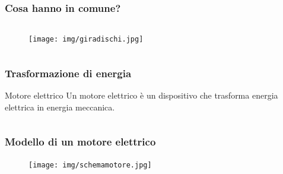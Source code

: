 \documentclass[]{beamer}
\theoremstyle{plain}
\begin{document}
\begin{frame}
\frametitle{Cosa hanno in comune?}
\begin{columns}
\begin{column}{0.3\textwidth}
\begin{figure}
\texttt{[image: img/giradischi.jpg]}
\end{figure}
\end{column}
\begin{column}{0.3\textwidth}
\end{column}
\begin{column}{0.3\textwidth}
\end{column}
\end{columns}
\end{frame}



\begin{frame}
\frametitle{Trasformazione di energia}
\begin{block}{Motore elettrico}
Un motore elettrico è un dispositivo che trasforma energia elettrica in energia meccanica.
\end{block}
\begin{columns}
\begin{column}{0.4\textwidth}
\end{column}
\begin{column}{0.4\textwidth}
\end{column}
\end{columns}
\end{frame}

\begin{frame}
\frametitle{Modello di un motore elettrico}
\begin{figure}
\texttt{[image: img/schemamotore.jpg]}
\end{figure}
\end{frame}
\end{document}
